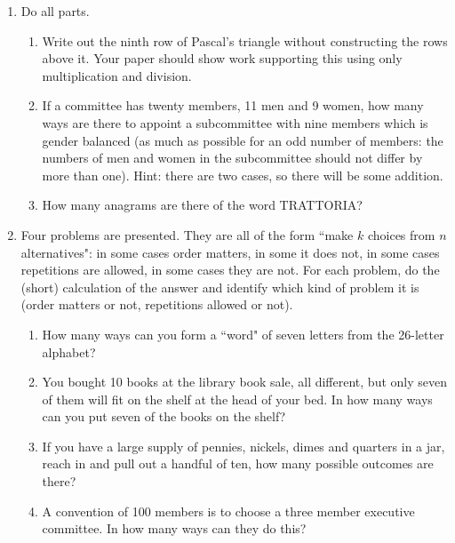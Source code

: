 \documentclass[12pt]{article}
\begin{document}
\begin{enumerate}
\item Do all parts.

\begin{enumerate}

\item  Write out the ninth row of Pascal's triangle without constructing the rows above it.  Your paper should show work supporting this using only multiplication and division.

\item  If a committee has twenty members, 11 men and 9 women, how many ways are there to appoint a subcommittee with nine members which is gender balanced (as much as possible for an odd number of members:  the numbers of men and women in the subcommittee should not differ by more than one).  Hint:  there are two cases, so there will be some addition.

\item How many anagrams are there of the word TRATTORIA?


\end{enumerate}

\newpage

\item Four problems are presented.  They are all of the form ``make $k$ choices from $n$ alternatives":  in some cases order matters, in some it does not, in some cases
repetitions are allowed, in some cases they are not.  For each problem, do the (short) calculation of the answer and identify which kind of problem it is (order matters or not, repetitions allowed or not).

\begin{enumerate}

\item  How many ways can you form a ``word" of seven letters from the 26-letter alphabet?

\item  You bought 10 books at the library book sale, all different, but only seven of them will fit on the shelf at the head of your bed.  In how many ways can you put seven of the books on the shelf?

\item  If you have a large supply of pennies, nickels, dimes and quarters in a jar, reach in and pull out a handful of ten, how many possible outcomes are there?

\item  A convention of 100 members is to choose a three member executive committee.  In how many ways can they do this?


\end{enumerate}
\end{enumerate}
\end{document}
